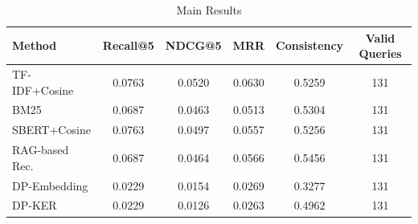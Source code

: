 \begin{table}[t]
\centering
\small
\caption{Main Results}
\label{tab:main_results}
\begin{tabular}{lccccc}
\hline
Method & Recall@5 & NDCG@5 & MRR & Consistency & Valid Queries \\
\hline
TF-IDF+Cosine & 0.0763 & 0.0520 & 0.0630 & 0.5259 & 131 \\
BM25 & 0.0687 & 0.0463 & 0.0513 & 0.5304 & 131 \\
SBERT+Cosine & 0.0763 & 0.0497 & 0.0557 & 0.5256 & 131 \\
RAG-based Rec. & 0.0687 & 0.0464 & 0.0566 & 0.5456 & 131 \\
DP-Embedding & 0.0229 & 0.0154 & 0.0269 & 0.3277 & 131 \\
DP-KER & 0.0229 & 0.0126 & 0.0263 & 0.4962 & 131 \\
\hline
\end{tabular}
\end{table}


